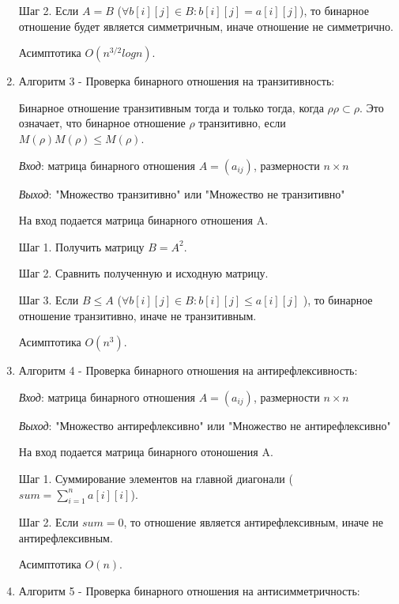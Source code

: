 \documentclass[spec, och, labwork]{shiza}
\begin{document}
\begin{enumerate}
                Шаг 2. Если $A = B$ ($\forall b[i][j] \in B: b[i][j] = a[i][j] $), то бинарное отношение будет является симметричным, иначе отношение не симметрично.

                Асимптотика $O(n^{3/2}logn)$.

                \item Алгоритм 3 - Проверка бинарного отношения на транзитивность:
                
                Бинарное отношение транзитивным тогда и только тогда, когда $\rho \rho \subset \rho$. Это означает, что бинарное
                отношение $\rho$ транзитивно, если $M(\rho)M(\rho) \leq M(\rho)$.
                
                \textit{Вход}: матрица бинарного отношения $A = (a_{ij})$, размерности $n \times n$

                \textit{Выход}: "Множество транзитивно" или "Множество не транзитивно"
                
                На вход подается матрица бинарного отношения A. 
                
                Шаг 1. Получить матрицу $B = A^2$.
                
                Шаг 2. Сравнить полученную и исходную матрицу.
                
                Шаг 3. Если $B \leq A$ ($\forall b[i][j] \in B: b[i][j] \leq a[i][j]$ ), то бинарное отношение транзитивно, иначе не транзитивным.

                Асимптотика $O(n^3)$.

                \item Алгоритм 4 - Проверка бинарного отношения на антирефлексивность:

                \textit{Вход}: матрица бинарного отношения $A = (a_{ij})$, размерности $n \times n$

                \textit{Выход}: "Множество антирефлексивно" или "Множество не антирефлексивно"
                
                На вход подается матрица бинарного отоношения A.

                Шаг 1. Суммирование элементов на главной диагонали ($sum = \sum\limits_{i=1}^n a[i][i]$).
                
                Шаг 2. Если $sum = 0$, то отношение является антирефлексивным, иначе не антирефлексивным.

                Асимптотика $O(n)$.

                \item Алгоритм 5 - Проверка бинарного отношения на антисимметричность:
                

\end{enumerate}
\end{document}
